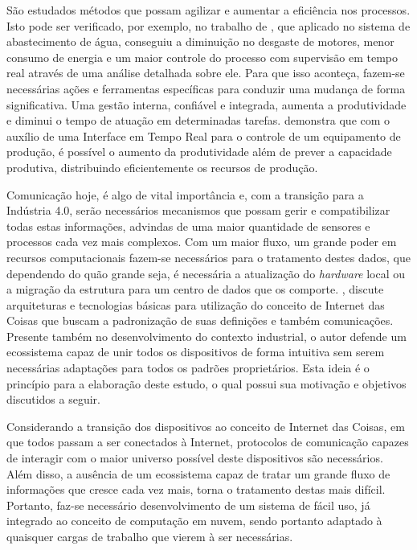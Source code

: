 São estudados métodos que possam agilizar e aumentar a eficiência nos processos. Isto pode ser verificado, por exemplo, no trabalho de , que aplicado no sistema de abastecimento de água, conseguiu a diminuição no desgaste de motores, menor consumo de energia e um maior controle do processo com supervisão em tempo real através de uma análise detalhada sobre ele. Para que isso aconteça, fazem-se necessárias ações e ferramentas específicas para conduzir uma mudança de forma significativa.
Uma gestão interna, confiável e integrada, aumenta a produtividade e diminui o tempo de atuação em  determinadas tarefas.   demonstra que com o auxílio de uma Interface em Tempo Real para o controle de um equipamento de produção, é possível o aumento da produtividade além de prever a capacidade produtiva, distribuindo eficientemente os recursos de produção.

Comunicação hoje, é algo de vital importância e, com a transição para a Indústria 4.0, serão necessários mecanismos que possam gerir e compatibilizar todas estas informações, advindas de uma maior quantidade de sensores e processos cada vez mais complexos. Com um maior fluxo, um grande poder em recursos computacionais fazem-se necessários para o tratamento destes dados, que dependendo do quão grande seja, é necessária a atualização do \textit{hardware} local ou a migração da estrutura para um centro de dados que os comporte. , discute arquiteturas e tecnologias básicas para utilização do conceito de Internet das Coisas que buscam a padronização de suas definições e também comunicações. Presente também no desenvolvimento do contexto industrial, o autor defende um ecossistema capaz de unir todos os dispositivos de forma intuitiva sem serem necessárias adaptações para todos os padrões proprietários. Esta ideia é o princípio para a elaboração deste estudo, o qual possui sua motivação e objetivos discutidos a seguir.

Considerando a transição dos dispositivos ao conceito de Internet das Coisas, em que todos passam a ser conectados à Internet, protocolos de comunicação capazes de interagir com o maior universo possível deste dispositivos são necessários. Além disso, a ausência de um ecossistema capaz de tratar um grande fluxo de informações que cresce cada vez mais, torna o tratamento destas mais difícil. Portanto, faz-se necessário desenvolvimento de um sistema de fácil uso, já integrado ao conceito de computação em nuvem, sendo portanto adaptado à quaisquer cargas de trabalho que vierem à ser necessárias.

